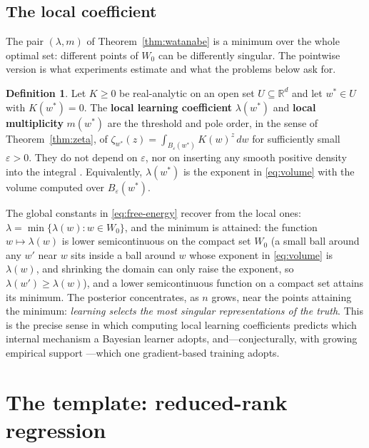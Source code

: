 \documentclass[11pt]{amsart}
\theoremstyle{plain}
\theoremstyle{definition}
\newtheorem{definition}[theorem]{Definition}
\newcommand{\R}{\mathbb{R}}
\begin{document}
\subsection{The local coefficient}\label{subsec:local}

The pair $(\lambda, m)$ of Theorem~\ref{thm:watanabe} is a minimum over the whole optimal set: different points of $W_0$ can be differently singular. The pointwise version is what experiments estimate and what the problems below ask for.

\begin{definition}\label{def:local}
Let $K \ge 0$ be real-analytic on an open set $U \subseteq \R^d$ and let $w^* \in U$ with $K(w^*) = 0$. The \textbf{local learning coefficient} $\lambda(w^*)$ and \textbf{local multiplicity} $m(w^*)$ are the threshold and pole order, in the sense of Theorem~\ref{thm:zeta}, of $\zeta_{w^*}(z) = \int_{B_\varepsilon(w^*)} K(w)^z\,dw$ for sufficiently small $\varepsilon > 0$. They do not depend on $\varepsilon$, nor on inserting any smooth positive density into the integral \cite{lau2023}. Equivalently, $\lambda(w^*)$ is the exponent in \eqref{eq:volume} with the volume computed over $B_\varepsilon(w^*)$.
\end{definition}

The global constants in \eqref{eq:free-energy} recover from the local ones: $\lambda = \min\{\lambda(w) : w \in W_0\}$, and the minimum is attained: the function $w \mapsto \lambda(w)$ is lower semicontinuous on the compact set $W_0$ (a small ball around any $w'$ near $w$ sits inside a ball around $w$ whose exponent in \eqref{eq:volume} is $\lambda(w)$, and shrinking the domain can only raise the exponent, so $\lambda(w') \ge \lambda(w)$), and a lower semicontinuous function on a compact set attains its minimum. The posterior concentrates, as $n$ grows, near the points attaining the minimum: \emph{learning selects the most singular representations of the truth}. This is the precise sense in which computing local learning coefficients predicts which internal mechanism a Bayesian learner adopts, and---conjecturally, with growing empirical support \cite{lau2023, murfet2026}---which one gradient-based training adopts.

\section{The template: reduced-rank regression}\label{sec:template}
\end{document}
